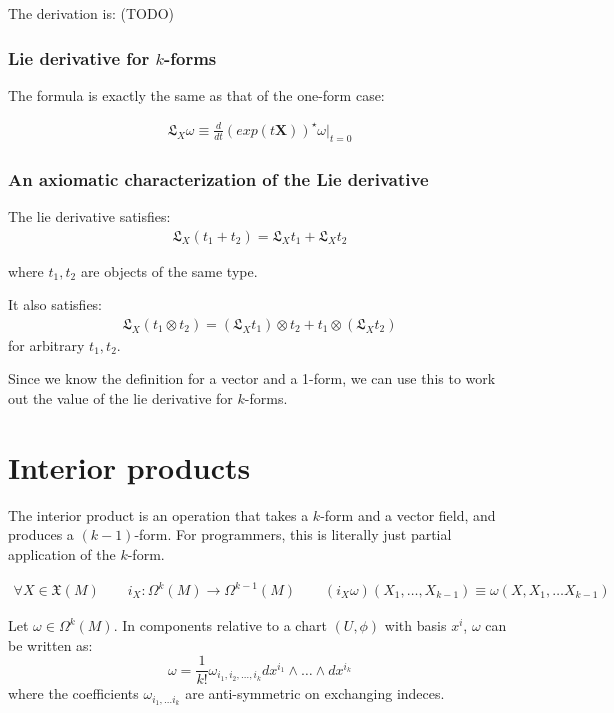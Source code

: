 \documentclass[11pt]{book}
\newcommand{\Lie}{\ensuremath{\mathfrak{L}}}
\newcommand{\pullback}[1]{\ensuremath{{#1}^{\star}}}
\begin{document}
The derivation is: (TODO)

\subsection{Lie derivative for $k$-forms}

The formula is exactly the same as that of the one-form case:

\begin{align*}
\Lie_X \omega \equiv \frac{d}{dt}\pullback{\left(exp(t\mathbf X)\right)} \omega|_{t = 0}
\end{align*}

\subsection{An axiomatic characterization of the Lie derivative}

The lie derivative satisfies:
\begin{align*}
    \Lie_X(t_1 + t_2) = \Lie_X t_1 + \Lie_X t_2
\end{align*}

where $t_1, t_2$ are objects of the same type.

It also satisfies:
\begin{align*}
    \Lie_X(t_1 \otimes t_2) = (\Lie_X t_1) \otimes t_2 + t_1 \otimes (\Lie_X t_2) 
\end{align*}
for arbitrary $t_1, t_2$.

Since we know the definition for a vector and a 1-form, we can use this to work
out the value of the lie derivative for $k$-forms.


\chapter{Interior products}
The interior product is an operation that takes a $k$-form and a vector field,
and produces a $(k-1)$-form.  For programmers, this is literally just partial
application of the $k$-form.

\begin{align*}
\forall X \in \mathfrak X (M)\qquad
i_X: \Omega^k(M) \rightarrow \Omega^{k-1}(M) \qquad
(i_X \omega) (X_1, \dots, X_{k-1}) \equiv \omega(X, X_1, \dots X_{k-1})
\end{align*}

Let $\omega \in \Omega^k(M)$. In components relative to a chart $(U, \phi)$ with
basis $x^i$, $\omega$ can be written as:
$$\omega = \frac{1}{k!} \omega_{i_1, i_2, \dots, i_k} dx^{i_1} \wedge \dots \wedge dx^{i_k}$$
where the coefficients $\omega_{i_1, \dots i_k}$ are anti-symmetric on
exchanging indeces.
\end{document}
